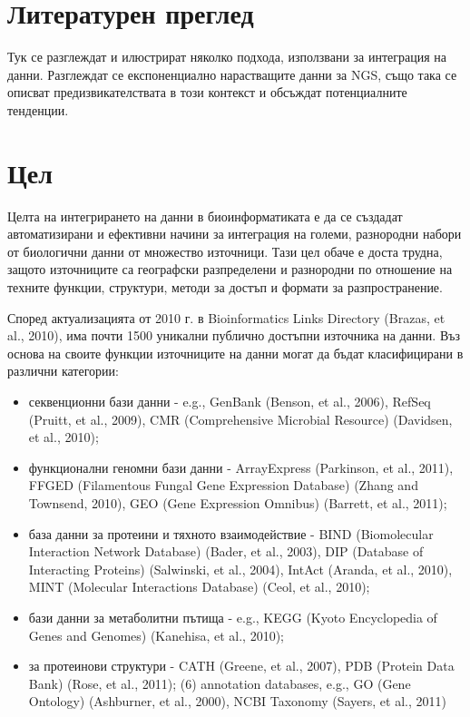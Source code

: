 \documentclass[12pt, a4paper, oneside]{book}
\begin{document}
\chapter*{Литературен преглед}

Тук се разглеждат и илюстрират няколко подхода, използвани за интеграция на данни. Разглеждат се експоненциално нарастващите данни за NGS, също така се описват предизвикателствата в този контекст и обсъждат потенциалните тенденции.\cite{BIOINFORMATICS-TRENDS-AND-METHODOLOGIES}

\chapter*{Цел}

Целта на интегрирането на данни в биоинформатиката е да се създадат автоматизирани и ефективни начини за интеграция на големи, разнородни набори от биологични данни от множество източници. Тази цел обаче е доста трудна, защото източниците са географски разпределени и разнородни по отношение на техните функции, структури, методи за достъп и формати за разпространение.\cite{BIOINFORMATICS-TRENDS-AND-METHODOLOGIES}

Според актуализацията от 2010 г. в Bioinformatics Links Directory (Brazas, et al., 2010), има почти 1500 уникални публично достъпни източника на данни. Въз основа на своите функции източниците на данни могат да бъдат класифицирани в различни категории:

\begin{itemize}
    \item секвенционни бази данни - e.g., GenBank (Benson, et al., 2006), RefSeq (Pruitt, et al., 2009), CMR (Comprehensive Microbial Resource) (Davidsen, et al., 2010);
    \item функционални геномни бази данни - ArrayExpress (Parkinson, et al., 2011), FFGED (Filamentous Fungal Gene Expression Database) (Zhang and Townsend, 2010), GEO (Gene Expression Omnibus) (Barrett, et al., 2011);
    \item база данни за протеини и тяхното взаимодействие - BIND (Biomolecular Interaction Network Database) (Bader, et al., 2003), DIP (Database of Interacting Proteins) (Salwinski, et al., 2004), IntAct (Aranda, et al., 2010), MINT (Molecular Interactions Database) (Ceol, et al., 2010);
    \item бази данни за метаболитни пътища - e.g., KEGG (Kyoto Encyclopedia of Genes and Genomes) (Kanehisa, et al., 2010);
    \item за протеинови структури - CATH (Greene, et al., 2007), PDB (Protein Data Bank) (Rose, et al., 2011); (6) annotation databases, e.g., GO (Gene Ontology) (Ashburner, et al., 2000), NCBI Taxonomy (Sayers, et al., 2011)
\end{itemize}
\end{document}
